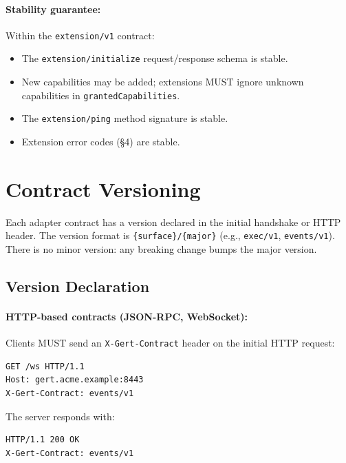 \paragraph{Stability guarantee:}

Within the \texttt{extension/v1} contract:

\begin{itemize}
  \item The \texttt{extension/initialize} request/response schema is stable.
  \item New capabilities may be added; extensions MUST ignore unknown
        capabilities in \texttt{grantedCapabilities}.
  \item The \texttt{extension/ping} method signature is stable.
  \item Extension error codes (§4) are stable.
\end{itemize}

\section{Contract Versioning}
\label{sec:contract-versioning}

Each adapter contract has a version declared in the initial handshake or HTTP
header.  The version format is \texttt{\{surface\}/\{major\}} (e.g.,
\texttt{exec/v1}, \texttt{events/v1}).  There is no minor version: any breaking
change bumps the major version.

\subsection{Version Declaration}

\paragraph{HTTP-based contracts (JSON-RPC, WebSocket):}

Clients MUST send an \texttt{X-Gert-Contract} header on the initial HTTP
request:

\begin{verbatim}
GET /ws HTTP/1.1
Host: gert.acme.example:8443
X-Gert-Contract: events/v1
\end{verbatim}

The server responds with:

\begin{verbatim}
HTTP/1.1 200 OK
X-Gert-Contract: events/v1
\end{verbatim}

